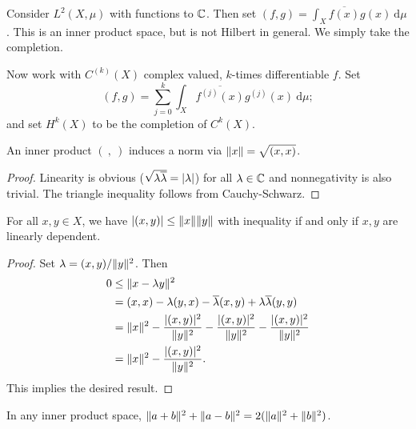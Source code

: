 \documentclass[10pt, twoside]{article}
\renewcommand{\d}{\ \mathrm{d}}
\begin{document}
    \begin{exm}
        Consider $L^2(X,\mu)$ with functions to $\mathbb{C}$. Then set $(f,g) = \int_X \overline{f(x)}g(x) \d\mu$. This is an inner product space, but is not Hilbert in general. We simply take the completion.
    \end{exm}

    \begin{exm}
        Now work with $C^{(k)}(X)$ complex valued, $k$-times differentiable $f$. Set \[(f,g) = \sum_{j=0}^k \int_X \overline{f^{(j)}(x)}g^{(j)}(x) \d\mu; \] and set $H^k(X)$ to be the completion of $C^k(X)$.
    \end{exm}

    \begin{lem}
        An inner product $(\ ,\ )$ induces a norm via $\lVert x\rVert = \sqrt{(x,x)}$.
        \begin{proof}
            Linearity is obvious ($\sqrt{\lambda \overline{\lambda}} = \lvert\lambda\rvert$) for all $\lambda \in \mathbb{C}$ and nonnegativity is also trivial. The triangle inequality follows from Cauchy-Schwarz.
        \end{proof}
    \end{lem}

    \begin{thm}
        For all $x,y \in X$, we have $\lvert(x,y)\rvert \leq \lVert x\rVert \lVert y\rVert$ with inequality if and only if $x,y$ are linearly dependent.
        \begin{proof}
            Set $\lambda = (x,y)/\lVert y\rVert^2$. Then
            \begin{align*}
                0 &\leq \lVert x - \lambda y\rVert^2 \\
                  &= (x,x) - \lambda(y,x) - \overline{\lambda}(x,y) + \lambda \overline{\lambda}(y,y)\\
                  &= \lVert x\rVert^2 - \frac{\lvert(x,y)\rvert^2}{\lVert y\rVert^2} - \frac{\lvert(x,y)\rvert^2}{\lVert y\rVert^2} - \frac{\lvert(x,y)\rvert^2}{\lVert y\rVert^2} \\
                  &= \lVert x\rVert^2 - \frac{\lvert(x,y)\rvert^2}{\lVert y\rVert^2}. \\
            \end{align*}
            This implies the desired result.
        \end{proof}
    \end{thm}

    \begin{thm}
        In any inner product space, $\lVert a+b\rVert^2 + \lVert a-b\rVert^2 = 2(\lVert a\rVert^2 + \lVert b\rVert^2)$.
    \end{thm}
\end{document}
